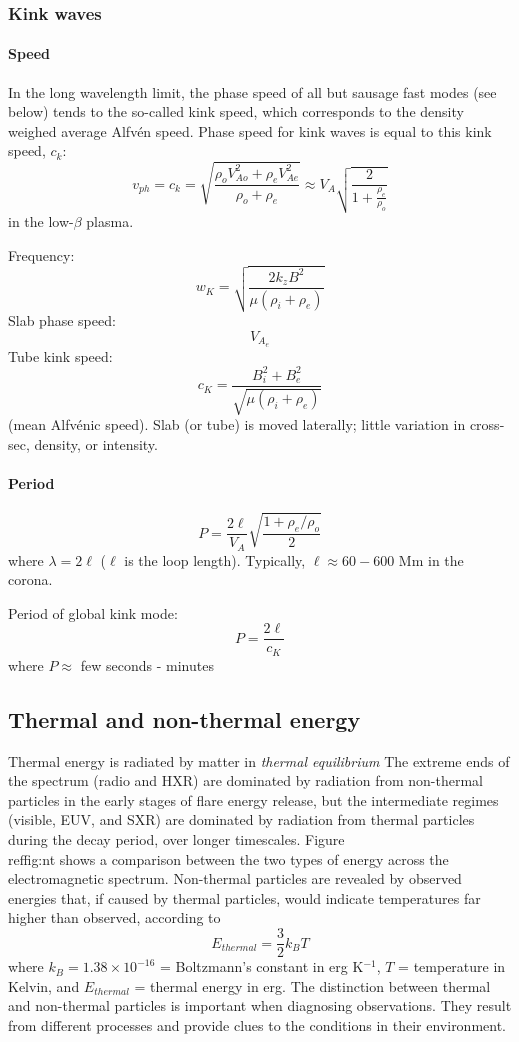 \subsubsection{Kink waves}

\paragraph{Speed}
In the long wavelength limit, the phase speed of all but sausage fast modes
(see below) tends to the so-called kink speed, which corresponds to the density
weighed average Alfv\'en speed.
Phase speed for kink waves is equal to this kink speed, $c_{k}$:
\[
    v_{ph}
    = c_{k}
    = \sqrt{\frac{\rho_{o}V^{2}_{Ao}+\rho_{e}V^{2}_{Ae}} {\rho_o+\rho_e}}
    \approx V_{A}\sqrt{\frac{2}{1 + \frac{\rho_{e}}{\rho_{o}}}}
    \]
in the low-$\beta$ plasma.

Frequency:
\[
    w_{K} = \sqrt{ \frac{2k_{z}B^{2}}{\mu(\rho_{i}+\rho_{e})}  }
    \]
Slab phase speed:
\[
    V_{A_{e}}
    \]
Tube kink speed:
\[
    c_{K} = \frac{B_{i}^{2} + B_{e}^{2}}{\sqrt{\mu(\rho_{i}+\rho_{e})}}
    \]
(mean Alfv\'enic speed). Slab (or tube) is moved laterally; little variation in
cross-sec, density, or intensity.

\paragraph{Period}
\[
    P = \frac{2\ell}{V_A}\sqrt{\frac{1+\rho_e/\rho_o}{2}}
    \]
where $\lambda=2\ell$ ($\ell$ is the loop length).
Typically, $\ell \approx 60-600$ Mm in the corona.

Period of global kink mode:
\[
    P = \frac{2\ell}{c_{K}}
    \]
where $P \approx $ few seconds - minutes

\newpage
\subsection{Thermal and non-thermal energy}
Thermal energy is radiated by matter in \textit{thermal equilibrium}
The extreme ends of the spectrum (radio and HXR) are dominated by
radiation from non-thermal particles in the early stages of flare
energy release, but the intermediate regimes (visible, EUV, and SXR)
are dominated by radiation from thermal particles during the decay
period, over longer timescales.
Figure~\\ref{fig:nt} shows a comparison
between the two types of energy across the electromagnetic spectrum.
Non-thermal particles are revealed by observed energies that, if
caused by thermal particles, would indicate temperatures far higher
than observed, according to
\begin{equation}
    E_{thermal} = \frac{3}{2}k_{B}T
\end{equation}
where $k_{B} = 1.38 \times 10^{-16}$ = Boltzmann's constant in erg
K$^{-1}$, $T$ = temperature in Kelvin, and $ E_{thermal} $ = thermal
energy in erg. The distinction between thermal and non-thermal
particles is important when diagnosing observations. They result from
different processes and provide clues to the conditions in their
environment.


